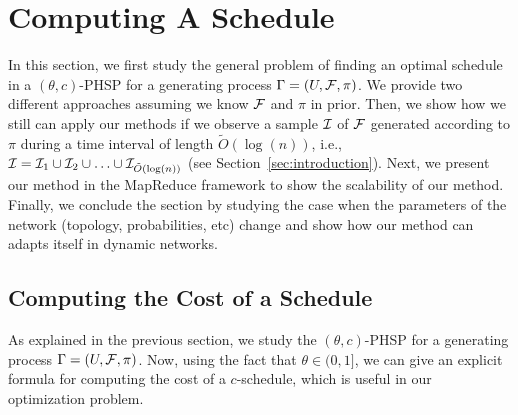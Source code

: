 \section{Computing A Schedule}\label{sec:method}
In this section, we first study the general problem of finding an optimal schedule in a  $(\theta,c)$-PHSP for a generating process $\sys = (U, \F, \pi)$. We provide two different approaches assuming we know $\F$ and $\pi$ in prior.  Then, we show how we still can apply our methods if we observe a sample $\S$ of $\F$ generated according to $\pi$ during a time interval of length $\tilde O(\log(n))$, i.e., $\S = \S_1\cup\S_2\cup\ldots\cup\S_{\tilde O(\log(n))}$ (see Section~\ref{sec:introduction}). Next, we present our method in the MapReduce framework to show the scalability of our method. Finally, we conclude the section by studying the case when the parameters of the network (topology, probabilities, etc) change and show how our method can adapts itself in dynamic networks.


% 



\subsection{Computing the Cost of a Schedule}\label{sec:optimize}
As explained in the previous section, we study the $(\theta,c)$-PHSP for a generating process $\sys=(U, \F, \pi)$. Now, using the fact that $\theta \in (0,1]$, we can give an explicit formula for computing the cost of a $c$-schedule, which is useful in our optimization problem.

